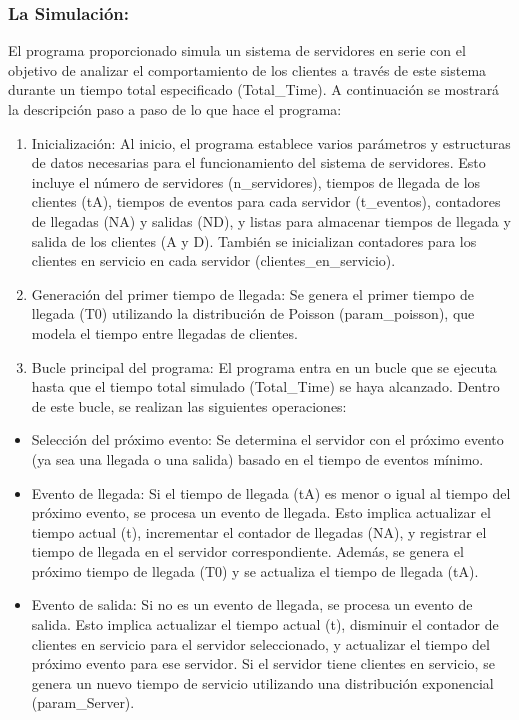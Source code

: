 \documentclass[
]{article}
\providecommand{\tightlist}{%
  \setlength{\itemsep}{0pt}\setlength{\parskip}{0pt}}
\begin{document}
\hypertarget{la-simulaciuxf3n}{%
\subsubsection{La Simulación:}\label{la-simulaciuxf3n}}

El programa proporcionado simula un sistema de servidores en serie con
el objetivo de analizar el comportamiento de los clientes a través de
este sistema durante un tiempo total especificado (Total\_Time). A
continuación se mostrará la descripción paso a paso de lo que hace el
programa:

\begin{enumerate}
\def\labelenumi{\arabic{enumi}.}
\tightlist
\item
  Inicialización: Al inicio, el programa establece varios parámetros y
  estructuras de datos necesarias para el funcionamiento del sistema de
  servidores. Esto incluye el número de servidores (n\_servidores),
  tiempos de llegada de los clientes (tA), tiempos de eventos para cada
  servidor (t\_eventos), contadores de llegadas (NA) y salidas (ND), y
  listas para almacenar tiempos de llegada y salida de los clientes (A y
  D). También se inicializan contadores para los clientes en servicio en
  cada servidor (clientes\_en\_servicio).
\item
  Generación del primer tiempo de llegada: Se genera el primer tiempo de
  llegada (T0) utilizando la distribución de Poisson (param\_poisson),
  que modela el tiempo entre llegadas de clientes.
\item
  Bucle principal del programa: El programa entra en un bucle que se
  ejecuta hasta que el tiempo total simulado (Total\_Time) se haya
  alcanzado. Dentro de este bucle, se realizan las siguientes
  operaciones:
\end{enumerate}

\begin{itemize}
\tightlist
\item
  Selección del próximo evento: Se determina el servidor con el próximo
  evento (ya sea una llegada o una salida) basado en el tiempo de
  eventos mínimo.
\item
  Evento de llegada: Si el tiempo de llegada (tA) es menor o igual al
  tiempo del próximo evento, se procesa un evento de llegada. Esto
  implica actualizar el tiempo actual (t), incrementar el contador de
  llegadas (NA), y registrar el tiempo de llegada en el servidor
  correspondiente. Además, se genera el próximo tiempo de llegada (T0) y
  se actualiza el tiempo de llegada (tA).
\item
  Evento de salida: Si no es un evento de llegada, se procesa un evento
  de salida. Esto implica actualizar el tiempo actual (t), disminuir el
  contador de clientes en servicio para el servidor seleccionado, y
  actualizar el tiempo del próximo evento para ese servidor. Si el
  servidor tiene clientes en servicio, se genera un nuevo tiempo de
  servicio utilizando una distribución exponencial (param\_Server).
\end{itemize}
\end{document}

